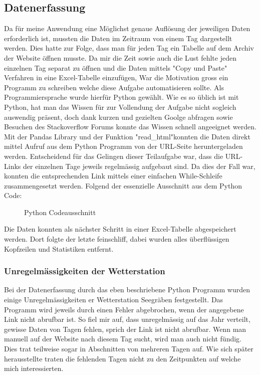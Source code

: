 \begin{refsection}
\subsection{Datenerfassung}
Da f\"ur meine Anwendung eine M\"oglichst genaue Aufl\"osung der jeweiligen Daten erforderlich ist, mussten die Daten im Zeitraum von einem Tag dargestellt werden. 
Dies hatte zur Folge, dass man f\"ur jeden Tag ein Tabelle auf dem Archiv der Website \"offnen musste. 
Da mir die Zeit sowie auch die Lust fehlte jeden einzelnen Tag separat zu \"offnen und die Daten mittels "Copy und Paste" Verfahren in eine Excel-Tabelle einzuf\"ugen, War die Motivation gross  ein Programm zu schreiben welche diese Aufgabe automatisieren sollte.
Als Programmiersprache wurde hierf\"ur Python gewählt.
Wie es so üblich ist mit Python, hat man das Wissen für zur Vollendung der Aufgabe nicht sogleich auswendig präsent, doch dank kurzen und gezielten Goolge abfragen sowie Besuchen des Stackoverflow Forums konnte das Wissen schnell angeeignet werden.
Mit der Pandas Library und der Funktion "read\_html"\space konnten die Daten direkt mittel Aufruf aus dem Python Programm von der URL-Seite heruntergeladen werden.
Entscheidend für das Gelingen dieser Teilaufgabe war, dass die URL-Links der einzelnen Tage jeweils regelmässig aufgebaut sind.
Da dies der Fall war, konnten die entsprechenden Link mittels einer einfachen While-Schleife zusammengesetzt werden.
\newpage
Folgend der essenzielle Ausschnitt aus dem Python Code:
\begin{figure}[h]
	\centering
	
	\caption{Python Codeausschnitt}
	\label{fig:python-code}
\end{figure}

Die Daten konnten als nächster Schritt in einer Excel-Tabelle abgespeichert werden.
Dort folgte der letzte feinschliff, dabei wurden alles überflüssigen Kopfzeilen und Statistiken entfernt.

\subsubsection{Unregelmässigkeiten der Wetterstation}
Bei der Datenerfassung durch das eben beschriebene Python Programm wurden einige Unregelmässigkeiten er Wetterstation Seegräben festgestellt.
Das Programm wird jeweils durch einen Fehler abgebrochen, wenn der angegebene Link nicht abrufbar ist. 
So fiel mir auf, dass unregelmässig auf das Jahr verteilt, gewisse Daten von Tagen fehlen, sprich der Link ist nicht abrufbar.
Wenn man manuell auf der Website nach diesem Tag sucht, wird man auch nicht fündig.
Dies trat teilweise sogar in Abschnitten von mehreren Tagen auf.
Wie sich später herausstellte traten die fehlenden Tagen nicht zu den Zeitpunkten auf welche mich interessierten.


\end{refsection}
